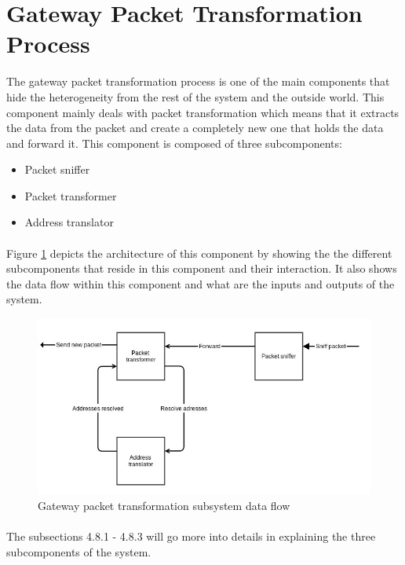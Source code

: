 \documentclass[oneside,12pt,a4paper,final]{book}
\begin{document}
\section{Gateway Packet Transformation Process}
The gateway packet transformation process is one of the main components that hide the heterogeneity from the rest of the system and the outside world. This component mainly deals with packet transformation which means that it extracts the data from the packet and create a completely new one that holds the data and forward it. This component is composed of three subcomponents:
\begin{itemize}
\item Packet sniffer
\item Packet transformer
\item Address translator
\end{itemize}
\paragraph{}
Figure \ref{fig:gateway_transformation} depicts the architecture of this component by showing the the different subcomponents that reside in this component and their interaction. It also shows the data flow within this component and what are the inputs and outputs of the system.

\begin{figure}[htbp]
\centering
\includegraphics[scale=0.6]{img/packet_transformation.jpg}
\caption{Gateway packet transformation subsystem data flow}
\label{fig:gateway_transformation}
\end{figure}
\paragraph{}
The subsections 4.8.1 - 4.8.3 will go more into details in explaining the three subcomponents of the system.
\end{document}
